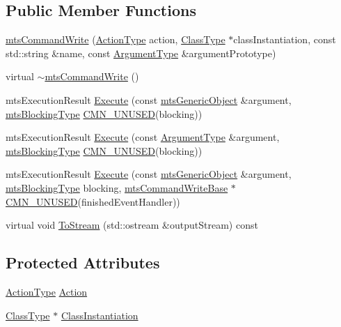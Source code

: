 \subsection*{Public Member Functions}
\begin{DoxyCompactItemize}
\item 
\hyperlink{classmts_command_write_ae9a351c406c99b4a49f475dc8b9c01f9}{mts\+Command\+Write} (\hyperlink{classmts_command_write_adb59c0a9491a687d96877bb27516b0e7}{Action\+Type} action, \hyperlink{classmts_command_write_aeccc8c434133c4adae34916b42ad493c}{Class\+Type} $\ast$class\+Instantiation, const std\+::string \&name, const \hyperlink{classmts_command_write_aa8ff942dbc4caedb34d83a5d6bf47c10}{Argument\+Type} \&argument\+Prototype)
\item 
virtual \hyperlink{classmts_command_write_aae4aa76caa281ece10b9993f7504735e}{$\sim$mts\+Command\+Write} ()
\item 
mts\+Execution\+Result \hyperlink{classmts_command_write_aecd4e16e77585b7913f115488be313e3}{Execute} (const \hyperlink{classmts_generic_object}{mts\+Generic\+Object} \&argument, \hyperlink{mts_forward_declarations_8h_ad7426ccb6c883bc780d0ee197dddcbe7}{mts\+Blocking\+Type} \hyperlink{cmn_portability_8h_a021894e2626935fa2305434b1e893ff6}{C\+M\+N\+\_\+\+U\+N\+U\+S\+E\+D}(blocking))
\item 
mts\+Execution\+Result \hyperlink{classmts_command_write_a404fee8a20e392018253f71aa4ccb848}{Execute} (const \hyperlink{classmts_command_write_aa8ff942dbc4caedb34d83a5d6bf47c10}{Argument\+Type} \&argument, \hyperlink{mts_forward_declarations_8h_ad7426ccb6c883bc780d0ee197dddcbe7}{mts\+Blocking\+Type} \hyperlink{cmn_portability_8h_a021894e2626935fa2305434b1e893ff6}{C\+M\+N\+\_\+\+U\+N\+U\+S\+E\+D}(blocking))
\item 
mts\+Execution\+Result \hyperlink{classmts_command_write_a3b67b44b7bd102b2cdd3ed01432aeb5c}{Execute} (const \hyperlink{classmts_generic_object}{mts\+Generic\+Object} \&argument, \hyperlink{mts_forward_declarations_8h_ad7426ccb6c883bc780d0ee197dddcbe7}{mts\+Blocking\+Type} blocking, \hyperlink{classmts_command_write_base}{mts\+Command\+Write\+Base} $\ast$\hyperlink{cmn_portability_8h_a021894e2626935fa2305434b1e893ff6}{C\+M\+N\+\_\+\+U\+N\+U\+S\+E\+D}(finished\+Event\+Handler))
\item 
virtual void \hyperlink{classmts_command_write_ab3e448149765a7588cf74b04e03dcf52}{To\+Stream} (std\+::ostream \&output\+Stream) const 
\end{DoxyCompactItemize}
\subsection*{Protected Attributes}
\begin{DoxyCompactItemize}
\item 
\hyperlink{classmts_command_write_adb59c0a9491a687d96877bb27516b0e7}{Action\+Type} \hyperlink{classmts_command_write_affee375369797c3ffb3aba6578d33b23}{Action}
\item 
\hyperlink{classmts_command_write_aeccc8c434133c4adae34916b42ad493c}{Class\+Type} $\ast$ \hyperlink{classmts_command_write_accc06c909f9145a73c5e56ea64e08872}{Class\+Instantiation}
\end{DoxyCompactItemize}
